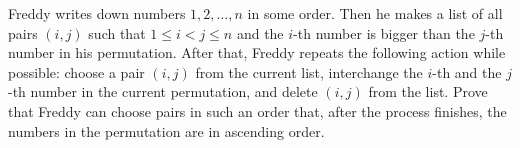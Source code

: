 Freddy writes down numbers $1, 2,\ldots ,n$ in some order. Then he makes a list of all pairs $(i, j)$ such that $1\le i<j\le n$ and the $i$-th number is bigger than the $j$-th number in his permutation. After that, Freddy repeats the following action while possible: choose a pair $(i, j)$ from the current list, interchange the $i$-th and the $j$-th number in the current permutation, and delete $(i, j)$ from the list. Prove that Freddy can choose pairs in such an order that, after the process finishes, the numbers in the permutation are in ascending order.